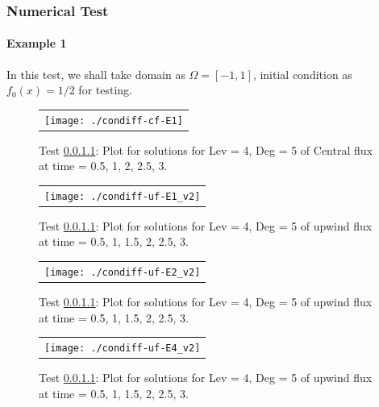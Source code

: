\documentclass[final,leqno]{siamltex704}
\begin{document}
\subsubsection{Numerical Test}
\paragraph{Example 1}\label{Sect1-Ex1}
In this test, we shall take domain as $\Omega=[-1,1]$, initial condition as $f_0(x)=1/2$  for testing.
\begin{figure}[H]
\centering
\begin{tabular}{c}
  \texttt{[image: ./condiff-cf-E1]}
  \end{tabular}
\caption{Test \ref{Sect1-Ex1}: Plot for solutions for Lev = 4, Deg = 5 of Central flux at time = 0.5, 1, 2, 2.5, 3.}
\end{figure}

\begin{figure}[H]
\centering
\begin{tabular}{c}
  \texttt{[image: ./condiff-uf-E1\_v2]}
  \end{tabular}
\caption{Test \ref{Sect1-Ex1}: Plot for solutions for Lev = 4, Deg = 5 of upwind flux at time = 0.5, 1, 1.5, 2, 2.5, 3.}
\end{figure}

\begin{figure}[H]
\centering
\begin{tabular}{c}
  \texttt{[image: ./condiff-uf-E2\_v2]}
  \end{tabular}
\caption{Test \ref{Sect1-Ex1}: Plot for solutions for Lev = 4, Deg = 5 of upwind flux at time = 0.5, 1, 1.5, 2, 2.5, 3.}
\end{figure}

\begin{figure}[H]
\centering
\begin{tabular}{c}
  \texttt{[image: ./condiff-uf-E4\_v2]}
  \end{tabular}
\caption{Test \ref{Sect1-Ex1}: Plot for solutions for Lev = 4, Deg = 5 of upwind flux at time = 0.5, 1, 1.5, 2, 2.5, 3.}
\end{figure}
\end{document}
